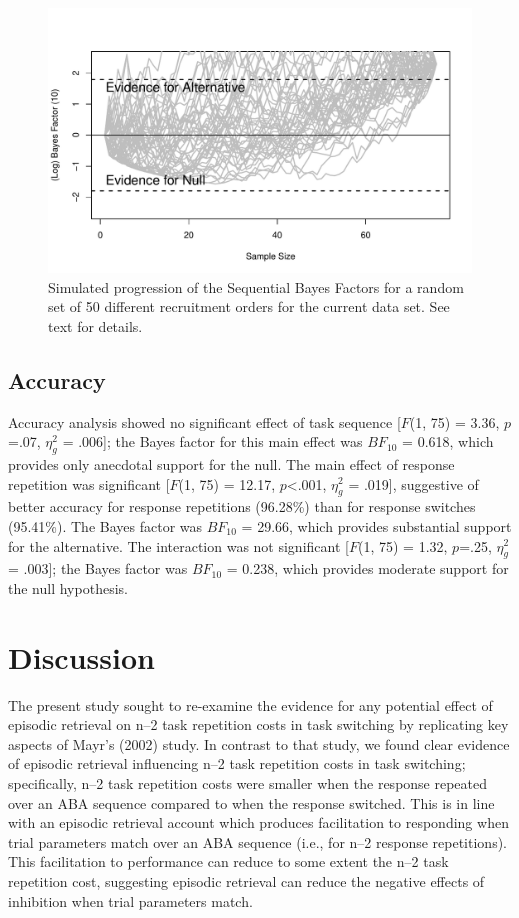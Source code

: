 \documentclass[a4paper, doc, natbib]{apa6}
\begin{document}
\begin{figure}
\begin{center}
\includegraphics[width = \textwidth]{Images/recruitmentOrder.pdf}
\caption{Simulated progression of the Sequential Bayes Factors for a random set of 50 different recruitment orders for the current data set. See text for details.}
\label{fig:recruitmentOrder}
\end{center}
\end{figure}


\subsection{Accuracy}
Accuracy analysis showed no significant effect of task sequence [$F$(1, 75) = 3.36, $p$=.07, $\eta_g^2$ = .006]; the Bayes factor for this main effect was $BF_{10}$ = 0.618, which provides only anecdotal support for the null. The main effect of response repetition was significant [$F$(1, 75) = 12.17, $p$<.001, $\eta_g^2$ = .019], suggestive of better accuracy for response repetitions (96.28\%) than for response switches (95.41\%). The Bayes factor was $BF_{10}$ = 29.66, which provides substantial support for the alternative. The interaction was not significant [$F$(1, 75) = 1.32, $p$=.25, $\eta_g^2$ = .003]; the Bayes factor was $BF_{10}$ = 0.238, which provides moderate support for the null hypothesis.

\section{Discussion}

The present study sought to re-examine the evidence for any potential effect of episodic retrieval on n--2 task repetition costs in task switching by replicating key aspects of Mayr's (2002) study. In contrast to that study, we found clear evidence of episodic retrieval influencing n--2 task repetition costs in task switching; specifically, n--2 task repetition costs were smaller when the response repeated over an ABA sequence compared to when the response switched. This is in line with an episodic retrieval account which produces facilitation to responding when trial parameters match over an ABA sequence (i.e., for n--2 response repetitions). This facilitation to performance can reduce to some extent the n--2 task repetition cost, suggesting episodic retrieval can reduce the negative effects of inhibition when trial parameters match.
\end{document}
